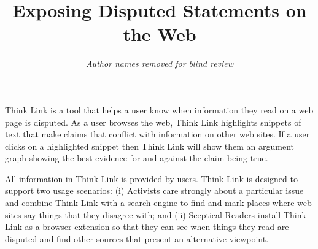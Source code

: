 \documentclass{chi2009}
\begin{document}

\toappear{}



\title{Exposing Disputed Statements on the Web}


\author{
\parbox[t]{9cm}{\centering
	     {\em Author names removed for blind review}\\
}
}

\maketitle


\abstract
Think Link is a tool that helps a user know when information they read on a web page is disputed. As a user browses the web, Think Link highlights snippets of text that make claims that conflict with information on other web sites. If a user clicks on a highlighted snippet then Think Link will show them an argument graph showing the best evidence for and against the claim being true.

All information in Think Link is provided by users. Think Link is designed to support two usage scenarios: (i) Activists care strongly about a particular issue and combine Think Link with a search engine to find and mark places where web sites say things that they disagree with; and (ii) Sceptical Readers install Think Link as a browser extension so that they can see when things they read are disputed and find other sources that present an alternative viewpoint.

\end{document}

